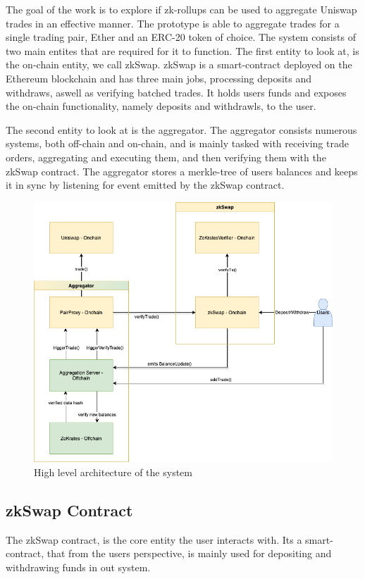 \documentclass[../../thesis.tex]{subfiles}
\begin{document}
The goal of the work is to explore if zk-rollups can be used to aggregate Uniswap trades in an effective manner. The prototype is able to aggregate trades for a single trading pair, Ether and an ERC-20 token of choice. The system consists of two main entites that are required for it to function. The first entity to look at, is the on-chain entity, we call zkSwap. zkSwap is a smart-contract deployed on the Ethereum blockchain and has three main jobs, processing deposits and withdraws, aswell as verifying batched trades. It holds users funds and exposes the on-chain functionality, namely deposits and withdrawls, to the user. 

The second entity to look at is the aggregator. The aggregator consists numerous systems, both off-chain and on-chain, and is mainly tasked with receiving trade orders, aggregating and executing them, and then verifying them with the zkSwap contract. The aggregator stores a merkle-tree of users balances and keeps it in sync by listening for event emitted by the zkSwap contract.

\begin{figure}[h]
    \centerline{\includegraphics[totalheight=8cm]{diagrams/architecture.png}}
    \caption{High level architecture of the system}
    \label{fig:architecture}
\end{figure}


\subsection{zkSwap Contract}
The zkSwap contract, is the core entity the user interacts with. Its a smart-contract, that from the users perspective, is mainly used for depositing and withdrawing funds in out system. 
\end{document}
